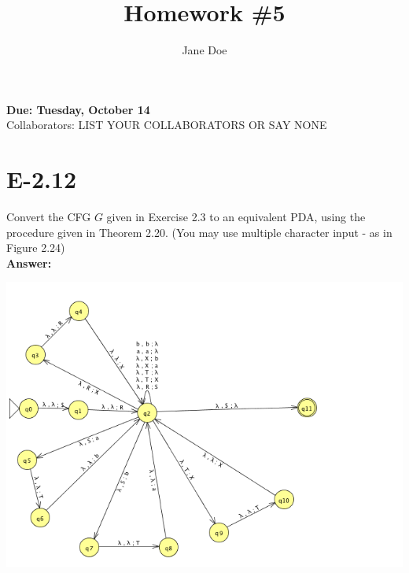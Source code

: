 \documentclass{article}
\author{Jane Doe}          %
\title{Homework \#5}       %
\begin{document}
\maketitle
\begin{center}     %
\Large{\bf Due: Tuesday, October 14}\\
Collaborators: LIST YOUR COLLABORATORS OR SAY NONE
\end{center}       %

\section*{E-2.12}
Convert the CFG $G$ given in Exercise 2.3 to an equivalent PDA, using the
procedure given in Theorem 2.20. (You may use multiple character input - as in 
Figure 2.24)\\

{\bf Answer: } %
\begin{center}  %
\includegraphics[width=.5\textwidth]{2_12.png}
\end{center}
\end{document}
